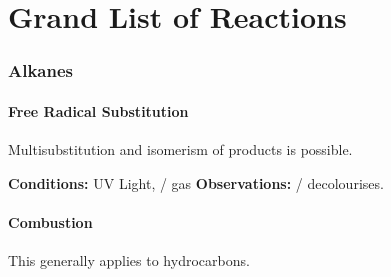 

\pagebreak
\hypertarget{AppendixListOfReactions}{}
\part{Grand List of Reactions}

	\section{Alkanes}

		\subsection{Free Radical Substitution}

			Multisubstitution and isomerism of products is possible.

			\vspace{1.5em}
			\vbox{\textbf{Conditions:}	\tabto{35mm}UV Light,  /  gas}
			\vbox{\textbf{Observations:}\tabto{35mm}  /   decolourises.}




		\subsection{Combustion}

			This generally applies to hydrocarbons.


